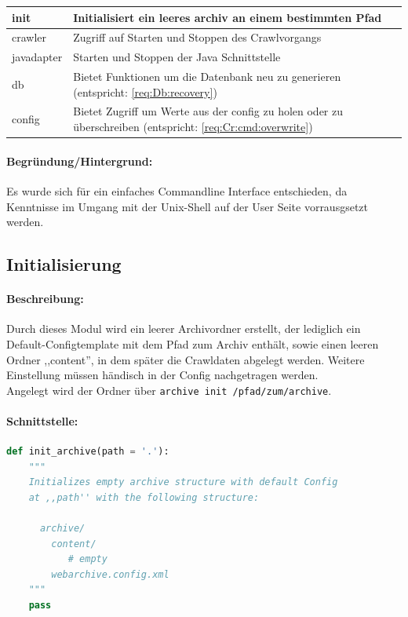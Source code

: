 \begin{table}[H]
\centering
\begin{tabular}{|l|l|}
    \hline
        init & Initialisiert ein leeres archiv an einem bestimmten Pfad \\
    \hline
        crawler & Zugriff auf Starten und Stoppen des Crawlvorgangs \\
    \hline
        javadapter & Starten und Stoppen der Java Schnittstelle \\
    \hline
    db & Bietet Funktionen um die Datenbank neu zu generieren
    (entspricht: \ref{req:Db:recovery}) \\
    \hline
        config & Bietet Zugriff um Werte aus der config zu holen oder zu überschreiben
        (entspricht: \ref{req:Cr:cmd:overwrite}) \\
    \hline
\end{tabular}
\end{table}

\paragraph{Begründung/Hintergrund:}
\label{par:begr_ndung_}
Es wurde sich für ein einfaches Commandline Interface entschieden, da
Kenntnisse im Umgang mit der Unix-Shell auf der User Seite vorrausgsetzt
werden.


\subsection{Initialisierung} 
\label{sub:initialisierung}
\paragraph{Beschreibung:}
\label{par:beschreibung}
Durch dieses Modul wird ein leerer Archivordner erstellt, der lediglich
ein Default-Configtemplate mit dem Pfad zum Archiv enthält, sowie einen leeren Ordner ,,content'',
in dem später die Crawldaten abgelegt werden.
Weitere Einstellung müssen händisch in der Config nachgetragen werden.
\\
Angelegt wird der Ordner über \texttt{archive init /pfad/zum/archive}.
\paragraph{Schnittstelle:}
\label{par:schnittstelle}
\hfill
\begin{lstlisting}[language=python]
def init_archive(path = '.'):
    """
    Initializes empty archive structure with default Config
    at ,,path'' with the following structure:

      archive/
        content/ 
           # empty
        webarchive.config.xml
    """
    pass
\end{lstlisting}

